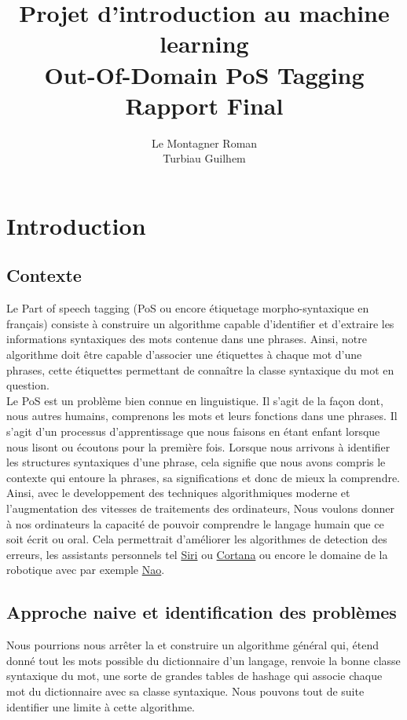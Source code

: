 \documentclass[french, 14pt]{memoir}
\title{\textbf{Projet d'introduction au machine learning\\
Out-Of-Domain PoS Tagging
\\Rapport Final}}
\author{Le Montagner Roman\\
		Turbiau Guilhem\\}
\date{}
\begin{document}
\maketitle

\tableofcontents

\chapter{Introduction}
\section{Contexte}
Le Part of speech tagging (PoS ou encore étiquetage morpho-syntaxique en français) consiste à construire un algorithme capable d'identifier et d'extraire les informations syntaxiques des mots contenue dans une phrases. Ainsi, notre algorithme doit être capable d'associer une étiquettes à chaque mot d'une phrases, cette étiquettes permettant de connaître la classe syntaxique du mot en question.\\
Le PoS est un problème bien connue en linguistique. Il s'agit de la façon dont, nous autres humains, comprenons les mots et leurs fonctions dans une phrases. Il s'agit d'un processus d'apprentissage que nous faisons en étant enfant lorsque nous lisont ou écoutons pour la première fois. Lorsque nous arrivons à identifier les structures syntaxiques d'une phrase, cela signifie que nous avons compris le contexte qui entoure la phrases, sa significations et donc de mieux la comprendre. Ainsi, avec le developpement des techniques algorithmiques moderne et l'augmentation des vitesses de traitements des ordinateurs, Nous voulons donner à nos ordinateurs la capacité de pouvoir comprendre le langage humain que ce soit écrit ou oral. Cela permettrait d'améliorer les algorithmes de detection des erreurs, les assistants personnels tel \href{https://www.apple.com/fr/siri/}{Siri} ou \href{https://www.microsoft.com/en-us/cortana}{Cortana} ou encore le domaine de la robotique avec par exemple \href{https://www.softbankrobotics.com/emea/fr/nao}{Nao}.

\section{Approche naive et identification des problèmes}

Nous pourrions nous arrêter la et construire un algorithme général qui, étend donné tout les mots possible du dictionnaire d'un langage, renvoie la bonne classe syntaxique du mot, une sorte de grandes tables de hashage qui associe chaque mot du dictionnaire avec sa classe syntaxique. Nous pouvons tout de suite identifier une limite à cette algorithme.
\end{document}
